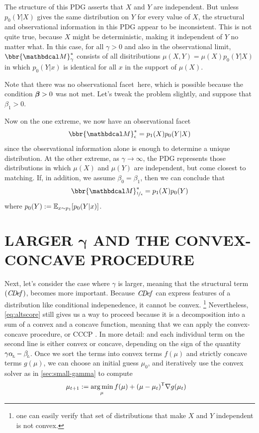 \documentclass{article}
\newcommand\obslimit{observational facet} %
\begin{document}
The structure of this PDG asserts that $X$ and $Y$ are independent.
But unless $p_0(Y|X)$ gives the same distribution on $Y$ for every value of $X$, the structural and observational information in this PDG appear to be inconsistent.
This is not quite true, because $X$ might be deterministic, making it independent of $Y$ no matter what. 
In this case, for all $\gamma > 0$ and also in the observational limit, 
$\bbr{\dg M}^*_\gamma$ consists of all disitributions $\mu(X,Y) = \mu(X)p_0(Y|X)$ in which
$p_0(Y|x)$ is identical for all $x$ in the support of $\mu(X)$.

Note that there was no \obslimit\ here, which is possible 
because the condition $\boldsymbol\beta > 0$ was not met.  Let's tweak the problem slightly, 
and suppose that $\beta_1 > 0$.

Now on the one extreme, we now have an \obslimit\
\[
    \bbr{\dg M}^*_{\epsilon} = p_1(X) p_0(Y|X)
\]
since the observational information alone is enough to determine a unique distribution.
At the other extreme, as $\gamma \to \infty$, the PDG represents those distributions 
in which $\mu(X)$ and $\mu(Y)$ are independent, but come closest to matching.
If, in addition, we assume $\beta_0 = \beta_1$, then we can conclude that
\[
    \bbr{\dg M}^*_{\nf1\epsilon} = p_1(X) p_0(Y) 
\]
where $p_0(Y) := \operatorname*{\mathbb{E}}_{x \sim p_1}[ p_0(Y|x) ]$.


\section{LARGER
    \texorpdfstring{$\boldsymbol\gamma$}{GAMMA} AND THE CONVEX-CONCAVE PROCEDURE}
    \label{sec:larger-gamma}

Next, let's consider the case where $\gamma$ is
larger, meaning that the structural term $(\mathit{C\mskip-3.5muD\mskip-2.5mue\mskip-1.5muf}_{})$,
becomes more important.
Because $\mathit{C\mskip-3.5muD\mskip-2.5mue\mskip-1.5muf}_{}$ can express features of a distribution like conditional indepenedence,
it cannot be convex.%
    \footnote{one can easily verify that set of distributions that make $X$ and $Y$ independent is not convex.}
Nevertheless, \eqref{eq:altscore} still gives us a way to proceed because it is a decomposition into a sum of a convex and a concave function, meaning that we can apply the convex-concave procedure, or CCCP \parencite{yuille2003concave}.
In more detail: and each individual term on the second line is either convex or concave, depending on the sign of the quantity $\gamma \alpha_{\!_{L}\!} - \beta_{\!_{L}\!}$.
Once we sort the terms into convex terms $f(\mu)$ and strictly concave terms $g(\mu)$, we can choose an initial guess $\mu_0$, and iteratively use the convex solver as in \cref{sec:small-gamma} to compute
%
\begin{align*}
    \mu_{t+1} &:= \operatorname*{arg\,min}_{\mu} f(\mu) + (\mu - \mu_{t})^{\sf T}
        \nabla g(\mu_t)
\end{align*}
\end{document}
